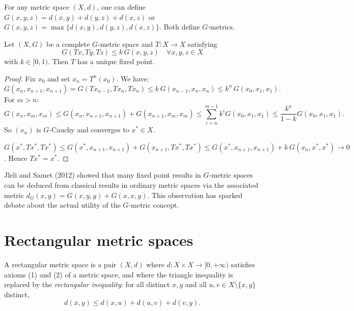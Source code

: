 \begin{example}
For any metric space $(X, d)$, one can define $G(x, y, z) = d(x, y) + d(y, z) + d(x, z)$
or $G(x, y, z) = \max\{d(x,y), d(y,z), d(x,z)\}$. Both define $G$-metrics.
\end{example}

\begin{theorem}
Let $(X, G)$ be a complete $G$-metric space and $T : X \to X$ satisfying
\[
    G(Tx, Ty, Tz) \leq k \, G(x, y, z) \quad \forall x, y, z \in X
\]
with $k \in [0, 1)$. Then $T$ has a unique fixed point.
\end{theorem}

\begin{proof}
Fix $x_0$ and set $x_n = T^n(x_0)$. We have:
\[
    G(x_n, x_{n+1}, x_{n+1}) = G(Tx_{n-1}, Tx_n, Tx_n) \leq k \, G(x_{n-1}, x_n, x_n)
    \leq k^n \, G(x_0, x_1, x_1).
\]
For $m > n$:
\[
    G(x_n, x_m, x_m) \leq G(x_n, x_{n+1}, x_{n+1}) + G(x_{n+1}, x_m, x_m)
    \leq \sum_{i=n}^{m-1} k^i G(x_0, x_1, x_1) \leq \frac{k^n}{1-k} G(x_0, x_1, x_1).
\]
So $(x_n)$ is $G$-Cauchy and converges to $x^* \in X$.

$G(x^*, Tx^*, Tx^*) \leq G(x^*, x_{n+1}, x_{n+1}) + G(x_{n+1}, Tx^*, Tx^*)
\leq G(x^*, x_{n+1}, x_{n+1}) + k \, G(x_n, x^*, x^*) \to 0$. Hence $Tx^* = x^*$.
\end{proof}

\begin{remark}
Jleli and Samet (2012) showed that many fixed point results in $G$-metric
spaces can be deduced from classical results in ordinary metric spaces via the
associated metric $d_G(x, y) = G(x, y, y) + G(x, x, y)$. This observation has
sparked debate about the actual utility of the $G$-metric concept.
\end{remark}

\section{Rectangular metric spaces}

\begin{definition}
A rectangular metric space is a pair $(X, d)$ where
$d : X \times X \to [0, +\infty)$ satisfies axioms (1) and (2) of a metric
space, and where the triangle inequality is replaced by the \emph{rectangular
inequality}: for all distinct $x, y$ and all $u, v \in X \setminus \{x, y\}$
distinct,
\[
    d(x, y) \leq d(x, u) + d(u, v) + d(v, y).
\]
\end{definition}

